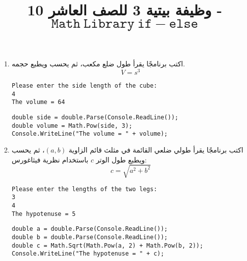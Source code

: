 ﻿\documentclass[12pt]{article}
\title{وظيفة بيتية 3 للصف العاشر 10 - $\mathtt{Math\ Library\ if-else}$}
\begin{document}
\maketitle
\thispagestyle{fancy}

\begin{enumerate}[itemsep=3em]
    \item
    اكتب برنامجًا يقرأ طول ضلع مكعب، ثم يحسب ويطبع حجمه.
    \[
    V = s^3
    \]
    \ifdetailed
    \begin{boxExample}
    \begin{english}
    \begin{verbatim}
Please enter the side length of the cube:
4
The volume = 64
    \end{verbatim}
    \end{english}
    \end{boxExample}
    \ifwithsols
    \begin{boxSolution}
    \begin{english}
    \begin{verbatim}
double side = double.Parse(Console.ReadLine());
double volume = Math.Pow(side, 3);
Console.WriteLine("The volume = " + volume);
    \end{verbatim}
    \end{english}
    \end{boxSolution}
    \clearpage
    \fi
    \fi

    \item
    اكتب برنامجًا يقرأ طولي ضلعي القائمة في مثلث قائم الزاوية $(a, b)$، ثم يحسب ويطبع طول الوتر $c$ باستخدام نظرية فيثاغورس:
    \[
        c = \sqrt{a^2 + b^2}
    \]
    \ifdetailed
    \begin{boxExample}
        \begin{english}
    \begin{verbatim}
Please enter the lengths of the two legs:
3
4
The hypotenuse = 5
    \end{verbatim}
\end{english}
\end{boxExample}
\ifwithsols
\begin{boxSolution}
    \begin{english}
        \begin{verbatim}
double a = double.Parse(Console.ReadLine());
double b = double.Parse(Console.ReadLine());
double c = Math.Sqrt(Math.Pow(a, 2) + Math.Pow(b, 2));
Console.WriteLine("The hypotenuse = " + c);
        \end{verbatim}
    \end{english}
\end{boxSolution}
\fi
\clearpage
\fi



\end{enumerate}
\end{document}
